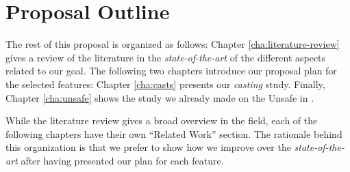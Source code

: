 \section{Proposal Outline}

The rest of this proposal is organized as follows:
Chapter \ref{cha:literature-review} gives a review of the literature in the \emph{state-of-the-art} of the different aspects related to our goal.
The following two chapters introduce our proposal plan for the selected features:
Chapter \ref{cha:casts} presents our \emph{casting} study.
Finally, Chapter \ref{cha:unsafe} shows the study we already made on the Unsafe \api{} in \java{}.

While the literature review gives a broad overview in the field, each of the following chapters have their own ``Related Work'' section. 
The rationale behind this organization is that we prefer to show how we improve over the \emph{state-of-the-art} after having presented our plan for each feature.
